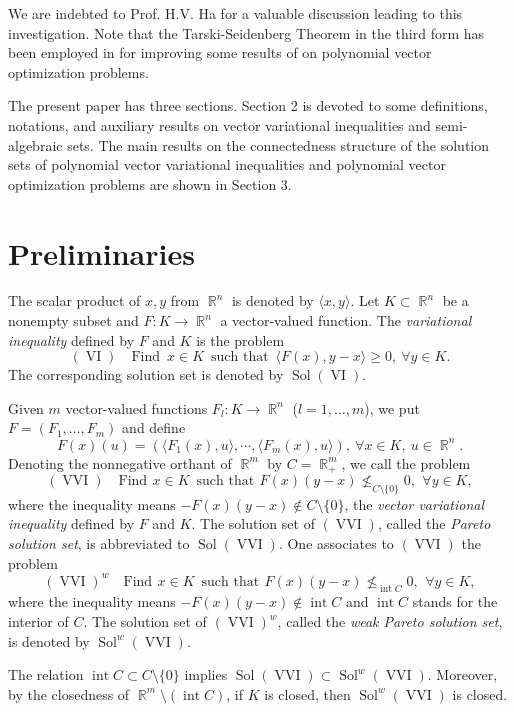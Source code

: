 \documentclass[]{interact}
\theoremstyle{plain}%
\theoremstyle{definition}
\DeclareMathOperator{\Sol}{Sol}
\DeclareMathOperator{\VI}{VI}
\DeclareMathOperator{\R}{\mathbb{R}}
\DeclareMathOperator{\VVI}{VVI}
\DeclareMathOperator{\inte}{int}
\begin{document}
We are indebted to Prof. H.V. Ha for a valuable discussion leading to this investigation. Note that the Tarski-Seidenberg Theorem in the third form has been employed in \cite[Remark 3.2]{KimPhamTuyen2016} for improving some results of \cite{HYY2015b} on polynomial vector optimization problems.

The present paper has three sections. Section 2 is devoted to some definitions, notations, and auxiliary results on vector variational inequalities and semi-algebraic sets. The main results on the connectedness structure of the solution sets of polynomial vector variational inequalities and polynomial vector optimization problems are shown in Section 3.

\section{Preliminaries}

The scalar product of $x, y$ from $\R^n$ is denoted by $\langle x,y\rangle$. Let $K\subset\R^n$ be a nonempty subset and $F: K\to\R^n$ a vector-valued function. The \textit{variational inequality} defined by $F$ and $K$ is the problem
$${(\VI)} \quad {\text{Find}}\ \; x\in K \ \;  \text{such that}\ \; \langle F(x),y-x\rangle\geq 0,\  \forall y\in K.$$
The corresponding solution set is denoted by $\Sol(\VI)$.

Given $m$ vector-valued functions $F_l: K\to\R^n$ ($l=1,\dots, m$), we put $F=(F_1,\dots, F_m)$ and define
$$
F(x)(u)=( \langle F_1(x),u\rangle, \cdots, \langle F_m(x),u\rangle), \ \forall x\in K, \ u\in\R^n.
$$
Denoting the nonnegative orthant of  $\R^m$ by $C=\R^m_+$, we call the  problem
$${ (\VVI)} \quad {\text{Find}}\ \, x\in K \ \; \text{such that}\ \, F(x)(y-x)\nleq_{C\setminus\{0\}}0,\ \, \forall y\in K,$$ where the inequality means $-F(x)(y-x)\notin C\setminus\{0\}$, the \textit{vector variational inequality} defined by $F$ and $K$. The solution set of $(\VVI)$, called the \textit{Pareto solution set}, is abbreviated to $\Sol(\VVI)$. One associates to $(\VVI)$ the problem
$$(\VVI)^w \quad {\text{Find}}\ \, x\in K \ \; \text{such that}\ \, F(x)(y-x)\nleq_{\inte C}0, \ \, \forall y\in K,$$
where the inequality means $-F(x)(y-x)\notin \inte C$ and ${\inte}C$ stands for the interior of $C$. The solution set of $(\VVI)^w$, called the \textit{weak Pareto solution set}, is denoted by $\Sol^w(\VVI)$.

The relation $\inte C \subset C\setminus\{0\}$ implies $\Sol(\VVI)\subset\Sol^w(\VVI)$. Moreover, by the closedness of $\R^m\setminus(\inte C)$, if $K$ is closed, then $\Sol^w(\VVI)$ is closed.
\end{document}
